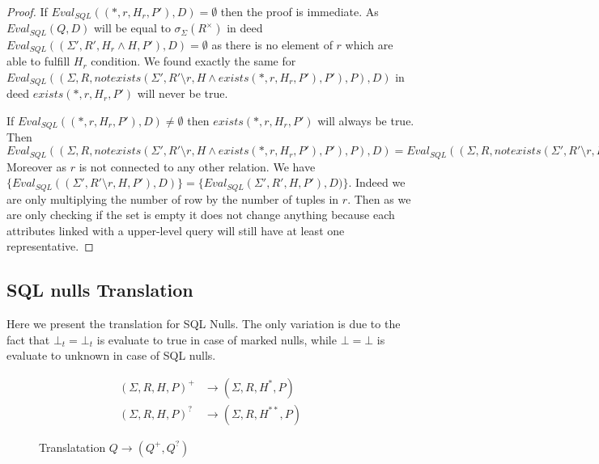 \begin{proof}
	If $Eval_{SQL}((*,r,H_r,P'),D) = \emptyset$ then the proof is immediate. As $Eval_{SQL}(Q,D)$ will be equal to $ \sigma_{\Sigma}(R^\times)$ in deed $Eval_{SQL}((\Sigma',R',H_r \land H,P'),D) = \emptyset$ as there is no element of $r$ which are able to fulfill $H_r$ condition. We found exactly the same for \\$Eval_{SQL}((\Sigma,R,notexists(\Sigma',R'\setminus r,H \land exists(*,r,H_r,P'),P'),P),D)$ in deed $exists(*,r,H_r,P')$ will never be true.
	
	If $Eval_{SQL}((*,r,H_r,P'),D) \neq \emptyset$ then $exists(*,r,H_r,P')$ will always be true. Then \\$Eval_{SQL}((\Sigma,R,notexists(\Sigma',R'\setminus r,H \land exists(*,r,H_r,P'),P'),P),D) = Eval_{SQL}((\Sigma,R,notexists(\Sigma',R'\setminus r,H,P'),P),D)$ Moreover as $r$ is not connected to any other relation. We have \\$\{Eval_{SQL}((\Sigma',R'\setminus r,H,P'),D)\} = \{Eval_{SQL}(\Sigma',R',H,P'),D)\}$. Indeed we are only multiplying the number of row by the number of tuples in $r$. Then as we are only checking if the set is empty it does not change anything because each attributes linked with a upper-level query will still have at least one representative.
\end{proof}

\subsection{SQL nulls Translation}

Here we present the translation for SQL Nulls. The only variation is due to the fact that $\bot_t = \bot_t$ is evaluate to true in case of marked nulls, while $\bot = \bot$ is evaluate to unknown in case of SQL nulls.

\begin{figure}[H]
	\caption{\label{q+2} Translatation $Q \rightarrow (Q^+,Q^?)$ }
	\begin{mdframed}
		\fontsize{8}{6}
\begin{align*}
	(\Sigma,R,H,P)^+ & \rightarrow (\Sigma,R,H^*,P) \\
	(\Sigma,R,H,P)^? & \rightarrow (\Sigma,R,H^{**},P) 
\end{align*}
\end{mdframed}
\end{figure}

